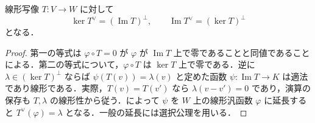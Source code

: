 \begin{prop}[双対写像の核と像]
線形写像 $T:V\to W$ に対して
\[
 \ker T^\vee=(\operatorname{Im}T)^\perp,\qquad
 \operatorname{Im}T^\vee=(\ker T)^\perp
\]
となる．
\end{prop}
\begin{proof}
第一の等式は $\varphi\circ T=0$ が $\varphi$ が $\operatorname{Im}T$ 上で零であることと同値であることによる．第二の等式について，$\varphi\circ T$ は $\ker T$ 上で零である．逆に $\lambda\in(\ker T)^\perp$ ならば $\psi(T(v))=\lambda(v)$ と定めた函数 $\psi:\operatorname{Im}T\to K$ は適法であり線形である．実際，$T(v)=T(v')$ なら $\lambda(v-v')=0$ であり，演算の保存も $T,\lambda$ の線形性から従う．によって $\psi$ を $W$ 上の線形汎函数 $\varphi$ に延長すると $T^\vee(\varphi)=\lambda$ となる．一般の延長には選択公理を用いる．
\end{proof}
